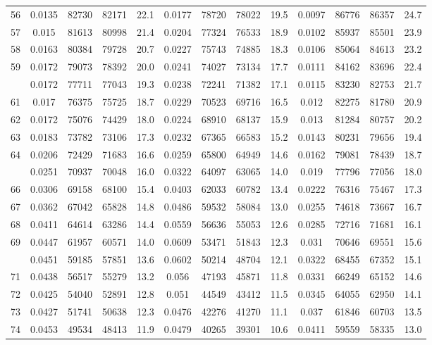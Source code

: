 \documentclass[
  14pt,
]{article}
\begin{document}
\begin{longtable}[t]{lcccccccccccc}
56 & 0.0135 & 82730 & 82171 & 22.1 & 0.0177 & 78720 & 78022 & 19.5 & 0.0097 & 86776 & 86357 & 24.7\\
57 & 0.015 & 81613 & 80998 & 21.4 & 0.0204 & 77324 & 76533 & 18.9 & 0.0102 & 85937 & 85501 & 23.9\\
58 & 0.0163 & 80384 & 79728 & 20.7 & 0.0227 & 75743 & 74885 & 18.3 & 0.0106 & 85064 & 84613 & 23.2\\
59 & 0.0172 & 79073 & 78392 & 20.0 & 0.0241 & 74027 & 73134 & 17.7 & 0.0111 & 84162 & 83696 & 22.4\\
\addlinespace
60 & 0.0172 & 77711 & 77043 & 19.3 & 0.0238 & 72241 & 71382 & 17.1 & 0.0115 & 83230 & 82753 & 21.7\\
61 & 0.017 & 76375 & 75725 & 18.7 & 0.0229 & 70523 & 69716 & 16.5 & 0.012 & 82275 & 81780 & 20.9\\
62 & 0.0172 & 75076 & 74429 & 18.0 & 0.0224 & 68910 & 68137 & 15.9 & 0.013 & 81284 & 80757 & 20.2\\
63 & 0.0183 & 73782 & 73106 & 17.3 & 0.0232 & 67365 & 66583 & 15.2 & 0.0143 & 80231 & 79656 & 19.4\\
64 & 0.0206 & 72429 & 71683 & 16.6 & 0.0259 & 65800 & 64949 & 14.6 & 0.0162 & 79081 & 78439 & 18.7\\
\addlinespace
65 & 0.0251 & 70937 & 70048 & 16.0 & 0.0322 & 64097 & 63065 & 14.0 & 0.019 & 77796 & 77056 & 18.0\\
66 & 0.0306 & 69158 & 68100 & 15.4 & 0.0403 & 62033 & 60782 & 13.4 & 0.0222 & 76316 & 75467 & 17.3\\
67 & 0.0362 & 67042 & 65828 & 14.8 & 0.0486 & 59532 & 58084 & 13.0 & 0.0255 & 74618 & 73667 & 16.7\\
68 & 0.0411 & 64614 & 63286 & 14.4 & 0.0559 & 56636 & 55053 & 12.6 & 0.0285 & 72716 & 71681 & 16.1\\
69 & 0.0447 & 61957 & 60571 & 14.0 & 0.0609 & 53471 & 51843 & 12.3 & 0.031 & 70646 & 69551 & 15.6\\
\addlinespace
70 & 0.0451 & 59185 & 57851 & 13.6 & 0.0602 & 50214 & 48704 & 12.1 & 0.0322 & 68455 & 67352 & 15.1\\
71 & 0.0438 & 56517 & 55279 & 13.2 & 0.056 & 47193 & 45871 & 11.8 & 0.0331 & 66249 & 65152 & 14.6\\
72 & 0.0425 & 54040 & 52891 & 12.8 & 0.051 & 44549 & 43412 & 11.5 & 0.0345 & 64055 & 62950 & 14.1\\
73 & 0.0427 & 51741 & 50638 & 12.3 & 0.0476 & 42276 & 41270 & 11.1 & 0.037 & 61846 & 60703 & 13.5\\
74 & 0.0453 & 49534 & 48413 & 11.9 & 0.0479 & 40265 & 39301 & 10.6 & 0.0411 & 59559 & 58335 & 13.0\\

\end{longtable}
\end{document}
